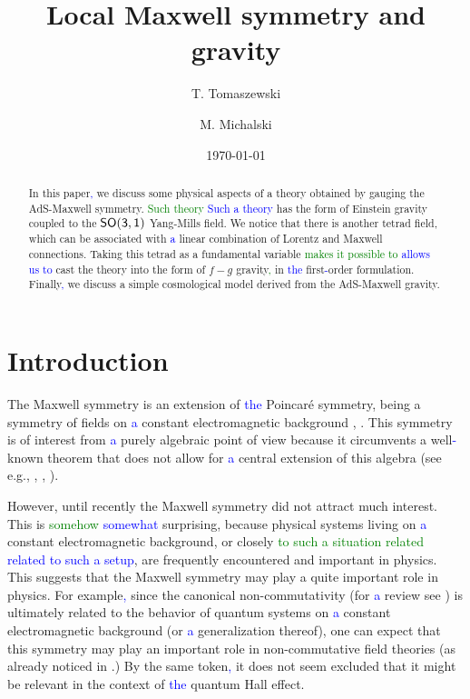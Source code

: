 \documentclass[prd,reprint,eqsecnum,nofootinbib]{revtex4-1}
\begin{document}
\title{Local Maxwell symmetry and gravity}
\author{T. Tomaszewski}
\author{M. Michalski}
\date{\today}
\begin{abstract}\noindent
In this paper\textcolor{blue}{,} we discuss some physical aspects of a theory obtained
by gauging the AdS-Maxwell symmetry. \textcolor{green}{Such theory} \textcolor{blue}{Such a theory} has the form of
Einstein gravity coupled to the $\sf{SO(3,1)}$ Yang-Mills field. We
notice that there is another tetrad field, which can be associated
with \textcolor{blue}{a} linear combination of Lorentz and Maxwell connections. Taking
this tetrad as a fundamental variable \textcolor{green}{makes it possible to} \textcolor{blue}{allows us to} cast the
theory into the form of $f-g$ gravity\textcolor{green}{,} in \textcolor{blue}{the} first\textcolor{blue}{-}order formulation.
Finally\textcolor{blue}{,} we discuss a simple cosmological model derived from the
AdS-Maxwell gravity.
\end{abstract}
\maketitle

\section{Introduction}

The Maxwell symmetry is an extension of \textcolor{blue}{the} Poincar\'e symmetry, being a
symmetry of fields on \textcolor{blue}{a} constant electromagnetic background
\cite{Bacry:1970ye}, \cite{Schrader:1972zd}. This symmetry is of
interest from \textcolor{blue}{a} purely algebraic point of view because it circumvents
a well\textcolor{blue}{-}known theorem that does not allow for \textcolor{blue}{a} central extension of
this algebra (see e.g., \cite{Galindo:1967}, \cite{Soroka:2011tc},
\cite{Gomis:2009dm}).

However, until recently the Maxwell symmetry did not attract much
interest. This is \textcolor{green}{somehow} \textcolor{blue}{somewhat} surprising, because physical systems
living on \textcolor{blue}{a} constant electromagnetic background, or closely \textcolor{green}{to such a situation related} \textcolor{blue}{related to such a setup}, are frequently encountered and important in
physics. This suggests that the Maxwell symmetry may play a quite
important role in physics. For example\textcolor{blue}{,} since the canonical
non-commutativity (for \textcolor{blue}{a} review see \cite{Douglas:2001ba}) is
ultimately related to the behavior of quantum systems on \textcolor{blue}{a} constant
electromagnetic background (or \textcolor{blue}{a} generalization thereof), one can
expect that this symmetry may play an important role in
non-commutative field theories (as already noticed in
\cite{Doplicher:1994tu}.) By the same token\textcolor{blue}{,} it does not seem
excluded that it might be relevant in the context of \textcolor{blue}{the} quantum Hall
effect.
\end{document}
